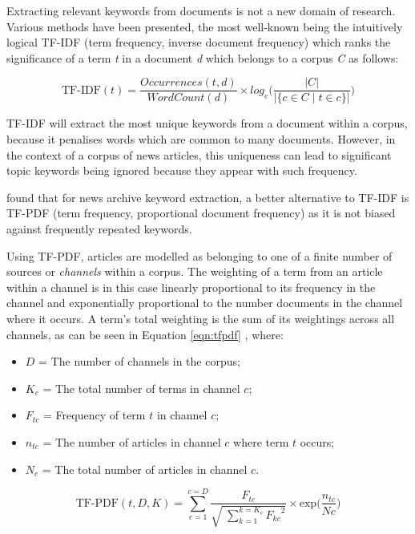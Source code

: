 Extracting relevant keywords from documents is not a new domain of research. Various methods have been presented, the most well-known being the intuitively logical TF-IDF (term frequency, inverse document frequency) \citep{TermWeightingApproachesInAutomaticTextRetrieval} which ranks the significance of a term \textit{t} in a document \textit{d} which belongs to a corpus \textit{C} as follows:

\begin{equation}
	\text{TF-IDF}(t) = \frac{Occurrences(t, d)}{WordCount(d)} \times log_e\bigg(\frac{|C|}{|\{c \in C \mid t \in c\}|}\bigg)
\label{eqn:tfidf}
\end{equation}

TF-IDF will extract the most unique keywords from a document within a corpus, because it penalises words which are common to many documents. However, in the context of a corpus of news articles, this uniqueness can lead to significant topic keywords being ignored because they appear with such frequency. 

\citet{TopicExtractionfromnewsArchiveUsingTFPDFAlgorithm} found that for news archive keyword extraction, a better alternative to TF-IDF is TF-PDF (term frequency, proportional document frequency) as it is not biased against frequently repeated keywords.

Using TF-PDF, articles are modelled as belonging to one of a finite number of sources or \textit{channels} within a corpus. The weighting of a term from an article within a channel is in this case linearly proportional to its frequency in the channel and exponentially proportional to the number documents in the channel where it occurs. A term's total weighting is the sum of its weightings across all channels, as can be seen in Equation \ref{eqn:tfpdf} \citep{TopicExtractionfromnewsArchiveUsingTFPDFAlgorithm}, where:
\begin{itemize}[noitemsep]
	\item $D$ = The number of channels in the corpus;
	\item $K_c$ = The total number of terms in channel $c$;
	\item $F_{tc}$ = Frequency of term $t$ in channel $c$;
	\item $n_{tc}$ = The number of articles in channel $c$ where term $t$ occurs;
	\item $N_c$ = The total number of articles in channel $c$.
\end{itemize}
\begin{equation}
	\label{eqn:tfpdf}
	\text{TF-PDF}(t, D, K) = \sum_{c=1}^{c=D}\frac{F_{tc}}{\sqrt{\;\sum\limits_{k=1}^{k={K_c}}{F_{kc}}^2}}\times\text{exp}{\bigg(\frac{n_{tc}}{Nc}\bigg)}
\end{equation}

